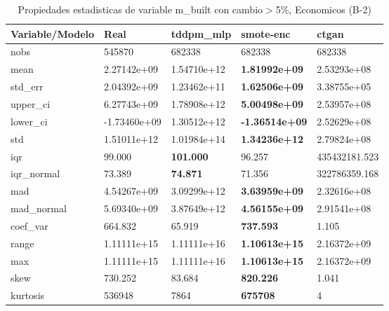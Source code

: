 \begin{table}[H]
\centering
\fontsize{8}{14}\selectfont
\caption{Propiedades estadisticas de variable m\_built con cambio\ensuremath{>}5\%, Economicos (B-2)}
\label{table-stats-economicos-b-2-m_built-short}
\begin{tabular}{|l|m{10em}|m{10em}|m{10em}|m{10em}|}
\hline
 \rowcolor[gray]{0.8}
Variable/Modelo & Real & tddpm\_mlp & smote-enc & ctgan \\
\hline nobs & 545870 & 682338 & 682338 & 682338 \\
\hline mean & 2.27142e+09 & \cellcolor[rgb]{0.9, 0.54, 0.52} 1.54710e+12 & \bfseries 1.81992e+09 & 2.53293e+08 \\
\hline std\_err & 2.04392e+09 & \cellcolor[rgb]{0.9, 0.54, 0.52} 1.23462e+11 & \bfseries 1.62506e+09 & 3.38755e+05 \\
\hline upper\_ci & 6.27743e+09 & \cellcolor[rgb]{0.9, 0.54, 0.52} 1.78908e+12 & \bfseries 5.00498e+09 & 2.53957e+08 \\
\hline lower\_ci & -1.73460e+09 & \cellcolor[rgb]{0.9, 0.54, 0.52} 1.30512e+12 & \bfseries -1.36514e+09 & 2.52629e+08 \\
\hline std & 1.51011e+12 & \cellcolor[rgb]{0.9, 0.54, 0.52} 1.01984e+14 & \bfseries 1.34236e+12 & 2.79824e+08 \\
\hline iqr & 99.000 & \bfseries 101.000 & 96.257 & \cellcolor[rgb]{0.9, 0.54, 0.52} 435432181.523 \\
\hline iqr\_normal & 73.389 & \bfseries 74.871 & 71.356 & \cellcolor[rgb]{0.9, 0.54, 0.52} 322786359.168 \\
\hline mad & 4.54267e+09 & \cellcolor[rgb]{0.9, 0.54, 0.52} 3.09299e+12 & \bfseries 3.63959e+09 & 2.32616e+08 \\
\hline mad\_normal & 5.69340e+09 & \cellcolor[rgb]{0.9, 0.54, 0.52} 3.87649e+12 & \bfseries 4.56155e+09 & 2.91541e+08 \\
\hline coef\_var & 664.832 & 65.919 & \bfseries 737.593 & \cellcolor[rgb]{0.9, 0.54, 0.52} 1.105 \\
\hline range & 1.11111e+15 & \cellcolor[rgb]{0.9, 0.54, 0.52} 1.11111e+16 & \bfseries 1.10613e+15 & 2.16372e+09 \\
\hline max & 1.11111e+15 & \cellcolor[rgb]{0.9, 0.54, 0.52} 1.11111e+16 & \bfseries 1.10613e+15 & 2.16372e+09 \\
\hline skew & 730.252 & 83.684 & \bfseries 820.226 & \cellcolor[rgb]{0.9, 0.54, 0.52} 1.041 \\
\hline kurtosis & 536948 & 7864 & \bfseries 675708 & \cellcolor[rgb]{0.9, 0.54, 0.52} 4 \\

\end{tabular}
\end{table}
